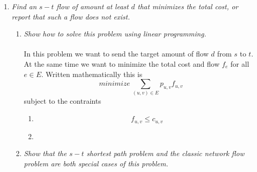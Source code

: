 \documentclass[12pt]{article}
\begin{document}
\begin{enumerate}
  \newpage
  \item \textit{Find an $s-t$ flow of amount at least $d$ that minimizes the
  total cost, or report that such a flow does not exist.}
  \begin{enumerate}
    \item \textit{Show how to solve this problem using linear programming.}\\
    \\
    In this problem we want to send the target amount of flow $d$ from $s$ to
    $t$.  At the same time we want to minimize the total cost and flow
    $f_e$ for all $e \in E$.  Written mathematically this is 
    $$
    minimize \, \sum_{(u,v) \in E} p_{u,v}f_{u,v}
    $$
    subject to the contraints
    \begin{enumerate}
      
      \item 
      $$
      f_{u,v} \le c_{u,v}
      $$
      
      \item
    \end{enumerate}
    
    
    \item \textit{Show that the $s-t$ shortest path problem and the classic
    network flow problem are both special cases of this problem.}
  \end{enumerate}

\end{enumerate}
\end{document}
